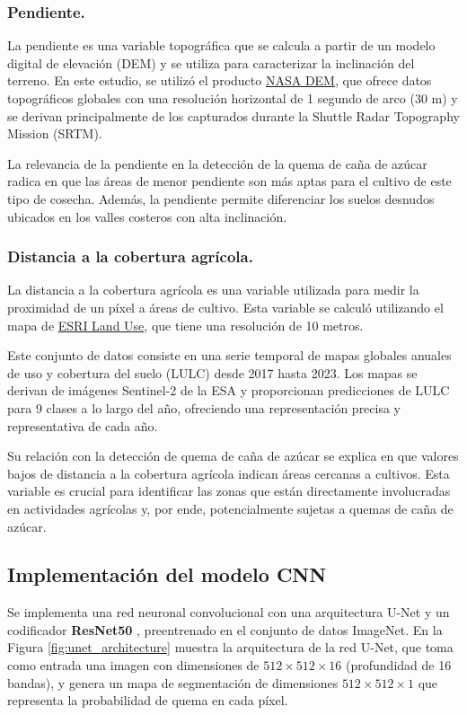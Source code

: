 \subsubsection{Pendiente.}
La pendiente es una variable topográfica que se calcula a partir de un modelo digital de elevación (DEM) y se utiliza para caracterizar la inclinación del terreno. En este estudio, se utilizó el 
producto \href{https://planetarycomputer.microsoft.com/dataset/nasadem}{NASA DEM}, que ofrece datos topográficos globales con una resolución horizontal de 1 segundo de arco (30 m) y 
se derivan principalmente de los capturados durante la Shuttle Radar Topography Mission (SRTM).

La relevancia de la pendiente en la detección de la quema de caña de azúcar radica en que las áreas de menor pendiente son más aptas para el cultivo de este tipo de cosecha. Además, la pendiente permite diferenciar 
los suelos desnudos ubicados en los valles costeros con alta inclinación.

\subsubsection{Distancia a la cobertura agrícola.}
La distancia a la cobertura agrícola es una variable utilizada para medir la proximidad de un píxel a áreas de cultivo. Esta variable se calculó utilizando el mapa de 
\href{https://planetarycomputer.microsoft.com/dataset/io-lulc-annual-v02}{ESRI Land Use}, que tiene una resolución de 10 metros.

Este conjunto de datos consiste en una serie temporal de mapas globales anuales de uso y cobertura del suelo (LULC) desde 2017 hasta 2023. Los mapas se derivan de imágenes Sentinel-2 de la ESA y 
proporcionan predicciones de LULC para 9 clases a lo largo del año, ofreciendo una representación precisa y representativa de cada año.

Su relación con la detección de quema de caña de azúcar se explica en que valores bajos de distancia a la cobertura agrícola indican áreas cercanas a cultivos. Esta variable es crucial para identificar las zonas 
que están directamente involucradas en actividades agrícolas y, por ende, potencialmente sujetas a quemas de caña de azúcar.

\subsection{Implementación del modelo CNN}
Se implementa una red neuronal convolucional con una arquitectura U-Net y un codificador \textbf{ResNet50} \citep{al_dabbagh_2023}, preentrenado en el conjunto de datos ImageNet. 
En la Figura \ref{fig:unet_architecture} muestra la arquitectura de la red U-Net, que toma como entrada una imagen con dimensiones de $512 \times 512 \times 16$ (profundidad de 16 bandas), 
y genera un mapa de segmentación de dimensiones $512 \times 512 \times 1$ que representa la probabilidad de quema en cada píxel. 

